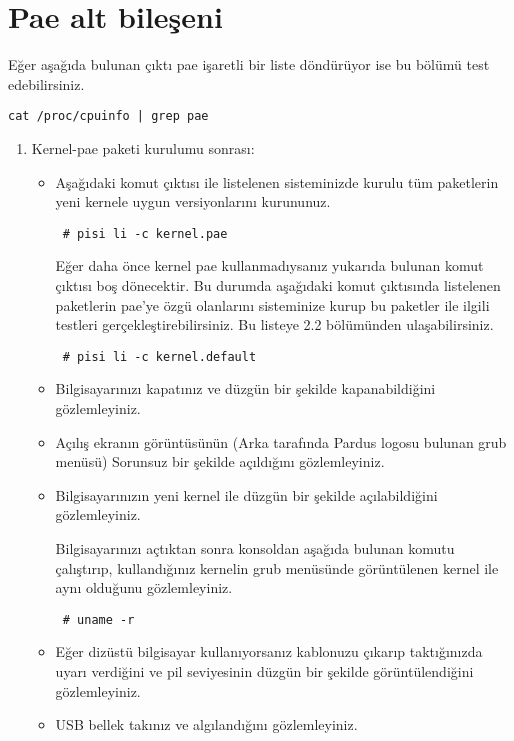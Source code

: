 \documentclass[a4paper,10pt]{article}
\begin{document}
\section{Pae alt bileşeni}

Eğer aşağıda bulunan çıktı pae işaretli bir liste döndürüyor ise bu bölümü test edebilirsiniz.
\begin{verbatim}
cat /proc/cpuinfo | grep pae 
\end{verbatim}

\begin{enumerate}

 \item Kernel-pae paketi kurulumu sonrası:

\begin{itemize}
\item
Aşağıdaki komut çıktısı ile listelenen sisteminizde kurulu tüm paketlerin yeni kernele uygun versiyonlarını kurununuz.
\begin{verbatim}
 # pisi li -c kernel.pae
\end{verbatim}

Eğer daha önce kernel pae kullanmadıysanız yukarıda bulunan komut çıktısı boş dönecektir. Bu durumda aşağıdaki komut çıktısında listelenen paketlerin pae'ye özgü olanlarını sisteminize kurup bu paketler ile ilgili testleri gerçekleştirebilirsiniz. Bu listeye 2.2 bölümünden ulaşabilirsiniz.

\begin{verbatim}
 # pisi li -c kernel.default
\end{verbatim}


\item Bilgisayarınızı kapatınız ve düzgün bir şekilde kapanabildiğini gözlemleyiniz.
\item Açılış ekranın görüntüsünün (Arka tarafında Pardus logosu bulunan grub menüsü) Sorunsuz bir şekilde açıldığını gözlemleyiniz.
\item Bilgisayarınızın yeni kernel ile düzgün bir şekilde açılabildiğini gözlemleyiniz.

Bilgisayarınızı açtıktan sonra konsoldan aşağıda bulunan komutu çalıştırıp, kullandığınız kernelin grub menüsünde görüntülenen kernel ile aynı olduğunu gözlemleyiniz.
\begin{verbatim}
 # uname -r 
\end{verbatim}

\item Eğer dizüstü bilgisayar kullanıyorsanız kablonuzu çıkarıp taktığınızda uyarı verdiğini ve pil seviyesinin düzgün bir şekilde görüntülendiğini gözlemleyiniz.
\item USB bellek takınız ve algılandığını gözlemleyiniz.
\end{itemize}


\end{enumerate}
\end{document}

